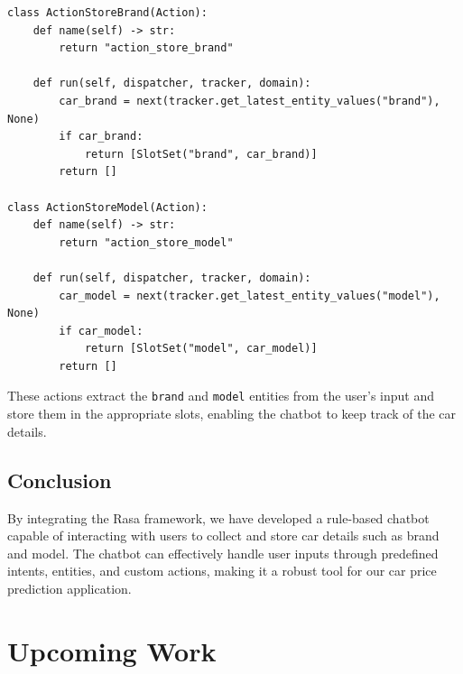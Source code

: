 \documentclass[a4paper,12pt]{article}
\begin{document}
\begin{verbatim}
class ActionStoreBrand(Action):
    def name(self) -> str:
        return "action_store_brand"

    def run(self, dispatcher, tracker, domain):
        car_brand = next(tracker.get_latest_entity_values("brand"), None)
        if car_brand:
            return [SlotSet("brand", car_brand)]
        return []
    
class ActionStoreModel(Action):
    def name(self) -> str:
        return "action_store_model"

    def run(self, dispatcher, tracker, domain):
        car_model = next(tracker.get_latest_entity_values("model"), None)
        if car_model:
            return [SlotSet("model", car_model)]
        return []
\end{verbatim}

These actions extract the \texttt{brand} and \texttt{model} entities from the user's input and store them in the appropriate slots, enabling the chatbot to keep track of the car details.

\subsection{Conclusion}
By integrating the Rasa framework, we have developed a rule-based chatbot capable of interacting with users to collect and store car details such as brand and model. The chatbot can effectively handle user inputs through predefined intents, entities, and custom actions, making it a robust tool for our car price prediction application.

\section{Upcoming Work}
\end{document}

